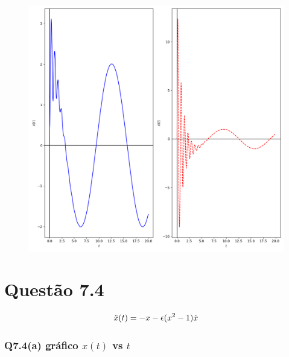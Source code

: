 \documentclass[12pt]{article}
\begin{document}
\begin{figure}[!hbt]
  \begin{center}
    \includegraphics[scale=0.71]{./Cod_73/x(t)_v(t)}
  \end{center}
\end{figure}

\section*{Questão 7.4}
{\bfseries
  \begin{equation*}
      \ddot{x}(t) = -x - \epsilon (x^2 -1) \dot{x} \\
  \end{equation*}
}

\subsubsection*{Q7.4(a) gráfico $x(t)$ vs $t$}
\end{document}
